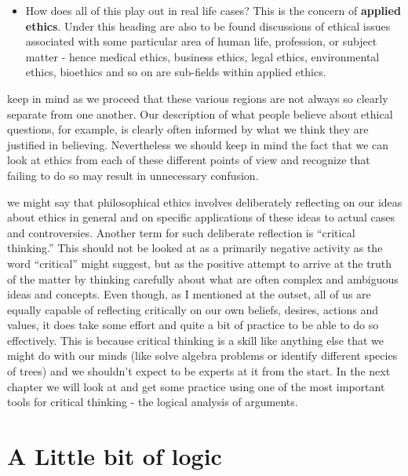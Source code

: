 \documentclass[justified]{tufte-book}
\providecommand{\tightlist}{%
  \setlength{\itemsep}{0pt}\setlength{\parskip}{0pt}}
\begin{document}
\begin{itemize}
\tightlist
\item
  How does all of this play out in real life cases? This is the concern of \textbf{applied ethics}. Under this heading are also to be found discussions of ethical issues associated with some particular area of human life, profession, or subject matter - hence medical ethics, business ethics, legal ethics, environmental ethics, bioethics and so on are sub-fields within applied ethics.
\end{itemize}

 keep in mind as we proceed that these various regions are not always so clearly separate from one another. Our description of what people believe about ethical questions, for example, is clearly often informed by what we think they are justified in believing. Nevertheless we should keep in mind the fact that we can look at ethics from each of these different points of view and recognize that failing to do so may result in unnecessary confusion.

 we might say that philosophical ethics involves deliberately reflecting on our ideas about ethics in general and on specific applications of these ideas to actual cases and controversies. Another term for such deliberate reflection is ``critical thinking.'' This should not be looked at as a primarily negative activity as the word ``critical'' might suggest, but as the positive attempt to arrive at the truth of the matter by thinking carefully about what are often complex and ambiguous ideas and concepts. Even though, as I mentioned at the outset, all of us are equally capable of reflecting critically on our own beliefs, desires, actions and values, it does take some effort and quite a bit of practice to be able to do so effectively. This is because critical thinking is a skill like anything else that we might do with our minds (like solve algebra problems or identify different species of trees) and we shouldn't expect to be experts at it from the start. In the next chapter we will look at and get some practice using one of the most important tools for critical thinking - the logical analysis of arguments.

\hypertarget{a-little-bit-of-logic}{%
\chapter{A Little bit of logic}\label{a-little-bit-of-logic}}
\end{document}
